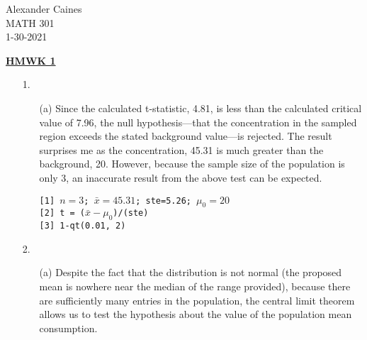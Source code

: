 \documentclass[12pt]{article}
\begin{document}
\vspace{1.0 \baselineskip}

\begin{flushright}
	Alexander Caines\\
	MATH 301\\
	1-30-2021\\
\end{flushright}

\begin{center}
	\textbf{\underline{HMWK 1}}
\end{center}



\begin{enumerate}
	\item[1.]
		\begin{enumerate}
			\item[(a)] Since the calculated t-statistic, 4.81, is less than the calculated critical value 
				of 7.96, the null hypothesis---that the concentration in the sampled region exceeds the stated
				 background value---is rejected. The result surprises me as the concentration, 45.31 is much greater 
				 than the background, 20. However, because the sample size of the population is only 3, an inaccurate result from the above test can be expected.
				 \begin{tcolorbox}[colback=white, title=Work, coltitle=white]
					 \texttt{[1] $n=3$; $\bar{x} = 45.31$; ste=5.26; $\mu_0 = 20$}\\
					 \texttt{[2] t = ($\bar{x}-\mu_0$)/(ste)}\\
					 \texttt{[3] 1-qt(0.01, 2)}\\
				 \end{tcolorbox}

		\end{enumerate}
	\item[2.]
		\begin{enumerate}
		 	\item[(a)] Despite the fact that the distribution 
				is not normal (the proposed mean is nowhere near the median of the range provided),
				because there are sufficiently 
				many entries in the population, the central 
				limit theorem allows us to test the hypothesis 
				about the value of the population mean consumption.


\end{enumerate}
\end{enumerate}
\end{document}
